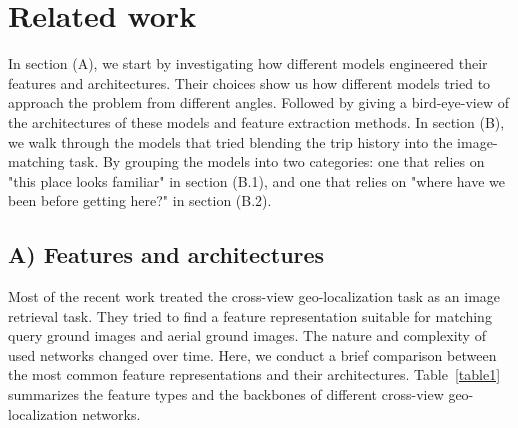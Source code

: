 \documentclass[10pt,letterpaper]{article}
\begin{document}
\section*{Related work}
In section (A), we start by investigating how different models engineered their features and architectures. Their choices show us how different models tried to approach the problem from different angles. Followed by giving a bird-eye-view of the architectures of these models and feature extraction methods. In section (B), we walk through the models that tried blending the trip history into the image-matching task. By grouping the models into two categories: one that relies on "this place looks familiar" in section (B.1), and one that relies on "where have we been before getting here?" in section (B.2).
\subsection*{A) Features and architectures}
Most of the recent work treated the cross-view geo-localization task as an image retrieval task. They tried to find a feature representation suitable for matching query ground images and aerial ground images. The nature and complexity of used networks changed over time. Here, we conduct a brief comparison between the most common feature representations and their architectures. Table~\ref{table1} summarizes the feature types and the backbones of different cross-view geo-localization networks.
\end{document}
